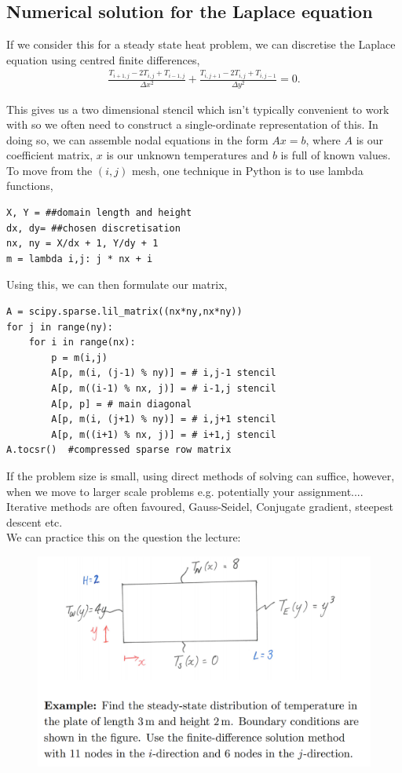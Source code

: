 \documentclass[11pt,a4paper]{report}
\theoremstyle{definition}
\begin{document}
		\subsection{Numerical solution for the Laplace equation}
			If we consider this for a steady state heat problem, we can discretise the Laplace equation using centred finite differences,
			\begin{align*}
				\frac{T_{i+1,j} - 2T_{i,j} + T_{i-1,j}}{\Delta x^2} + \frac{T_{i,j+1} - 2T_{i,j} + T_{i,j-1}}{\Delta y^2} = 0.
			\end{align*}
			
			This gives us a two dimensional stencil which isn't typically convenient to work with so we often need to construct a single-ordinate representation of this. In doing so, we can assemble nodal equations in the form $Ax=b$, where $A$ is our coefficient matrix, $x$ is our unknown temperatures and $b$ is full of known values.\\ 
			
			To move from the $(i,j)$ mesh, one technique in Python is to use lambda functions,
			\begin{lstlisting}
X, Y = ##domain length and height
dx, dy= ##chosen discretisation
nx, ny = X/dx + 1, Y/dy + 1
m = lambda i,j: j * nx + i
			\end{lstlisting}
			
			Using this, we can then formulate our matrix,
			\begin{lstlisting}
A = scipy.sparse.lil_matrix((nx*ny,nx*ny))
for j in range(ny):
	for i in range(nx):
		p = m(i,j)
		A[p, m(i, (j-1) % ny)] = # i,j-1 stencil
		A[p, m((i-1) % nx, j)] = # i-1,j stencil
		A[p, p] = # main diagonal
		A[p, m(i, (j+1) % ny)] = # i,j+1 stencil
		A[p, m((i+1) % nx, j)] = # i+1,j stencil
A.tocsr()  #compressed sparse row matrix
			\end{lstlisting}
			
			If the problem size is small, using direct methods of solving can suffice, however, when we move to larger scale problems e.g. potentially your assignment.... Iterative methods are often favoured, Gauss-Seidel, Conjugate gradient, steepest descent etc. \\
			
			We can practice this on the question the lecture:
			\begin{figure}[h!]
				\centering
				\includegraphics[width=1.0\textwidth]{work.png}
			\end{figure}
\end{document}
